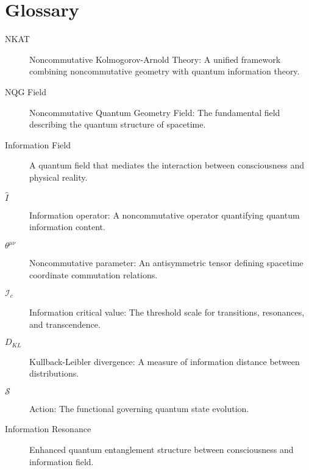 \section{Glossary}

\begin{description}
\item[NKAT] Noncommutative Kolmogorov-Arnold Theory: A unified framework combining noncommutative geometry with quantum information theory.

\item[NQG Field] Noncommutative Quantum Geometry Field: The fundamental field describing the quantum structure of spacetime.

\item[Information Field] A quantum field that mediates the interaction between consciousness and physical reality.

\item[\(\hat{I}\)] Information operator: A noncommutative operator quantifying quantum information content.

\item[\(\theta^{\mu\nu}\)] Noncommutative parameter: An antisymmetric tensor defining spacetime coordinate commutation relations.

\item[\(\mathcal{I}_c\)] Information critical value: The threshold scale for transitions, resonances, and transcendence.

\item[\(D_{KL}\)] Kullback-Leibler divergence: A measure of information distance between distributions.

\item[\(\mathcal{S}\)] Action: The functional governing quantum state evolution.

\item[Information Resonance] Enhanced quantum entanglement structure between consciousness and information field.
\end{description} 